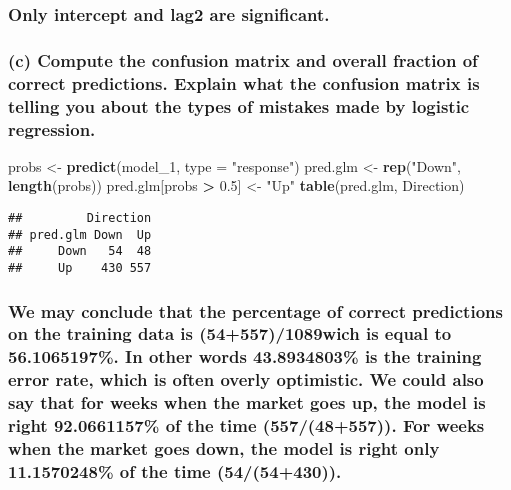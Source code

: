 \documentclass[]{article}
\newenvironment{Shaded}{\begin{snugshade}}{\end{snugshade}}
\newcommand{\KeywordTok}[1]{\textcolor[rgb]{0.13,0.29,0.53}{\textbf{#1}}}
\newcommand{\DataTypeTok}[1]{\textcolor[rgb]{0.13,0.29,0.53}{#1}}
\newcommand{\DecValTok}[1]{\textcolor[rgb]{0.00,0.00,0.81}{#1}}
\newcommand{\FloatTok}[1]{\textcolor[rgb]{0.00,0.00,0.81}{#1}}
\newcommand{\StringTok}[1]{\textcolor[rgb]{0.31,0.60,0.02}{#1}}
\newcommand{\OperatorTok}[1]{\textcolor[rgb]{0.81,0.36,0.00}{\textbf{#1}}}
\newcommand{\NormalTok}[1]{#1}
\begin{document}
\subsubsection{Only intercept and lag2 are
significant.}\label{only-intercept-and-lag2-are-significant.}

\subsubsection{(c) Compute the confusion matrix and overall fraction of
correct predictions. Explain what the confusion matrix is telling you
about the types of mistakes made by logistic
regression.}\label{c-compute-the-confusion-matrix-and-overall-fraction-of-correct-predictions.-explain-what-the-confusion-matrix-is-telling-you-about-the-types-of-mistakes-made-by-logistic-regression.}

\begin{Shaded}
\begin{Highlighting}[]
\NormalTok{probs <-}\StringTok{ }\KeywordTok{predict}\NormalTok{(model_}\DecValTok{1}\NormalTok{, }\DataTypeTok{type =} \StringTok{"response"}\NormalTok{)}
\NormalTok{pred.glm <-}\StringTok{ }\KeywordTok{rep}\NormalTok{(}\StringTok{"Down"}\NormalTok{, }\KeywordTok{length}\NormalTok{(probs))}
\NormalTok{pred.glm[probs }\OperatorTok{>}\StringTok{ }\FloatTok{0.5}\NormalTok{] <-}\StringTok{ "Up"}
\KeywordTok{table}\NormalTok{(pred.glm, Direction)}
\end{Highlighting}
\end{Shaded}

\begin{verbatim}
##         Direction
## pred.glm Down  Up
##     Down   54  48
##     Up    430 557
\end{verbatim}

\subsubsection{We may conclude that the percentage of correct
predictions on the training data is (54+557)/1089wich is equal to
56.1065197\%. In other words 43.8934803\% is the training error rate,
which is often overly optimistic. We could also say that for weeks when
the market goes up, the model is right 92.0661157\% of the time
(557/(48+557)). For weeks when the market goes down, the model is right
only 11.1570248\% of the time
(54/(54+430)).}\label{we-may-conclude-that-the-percentage-of-correct-predictions-on-the-training-data-is-545571089wich-is-equal-to-56.1065197.-in-other-words-43.8934803-is-the-training-error-rate-which-is-often-overly-optimistic.-we-could-also-say-that-for-weeks-when-the-market-goes-up-the-model-is-right-92.0661157-of-the-time-55748557.-for-weeks-when-the-market-goes-down-the-model-is-right-only-11.1570248-of-the-time-5454430.}
\end{document}

